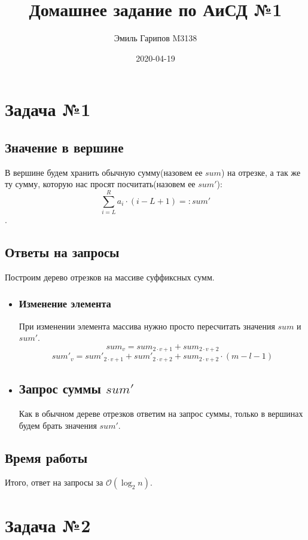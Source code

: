\documentclass{article}
\title{Домашнее задание по АиСД №1}
\date{2020-04-19}
\author{Эмиль Гарипов M3138}
\begin{document}
\newcommand{\RomanNumeralCaps}[1]
{\MakeUppercase{\romannumeral #1}}


\maketitle
\newpage
{}

\section*{Задача №1}
\subsection*{Значение в вершине}
В вершине будем хранить обычную сумму(назовем ее $sum$) на отрезке, а так же ту сумму, которую нас просят посчитать(назовем ее $sum'$):
$$ \sum_{i = L}^{R}a_i\cdot(i - L + 1) =: sum'$$.

\subsection*{Ответы на запросы}
Построим дерево отрезков на массиве суффиксных сумм.
\begin{itemize}
	\item[\RomanNumeralCaps{1}]
	\subsubsection*{Изменение элемента} 
	При изменении элемента массива нужно просто пересчитать значения $sum$ и $sum'$.
	$$sum_v = sum_{2\cdot v + 1} + sum_{2\cdot v + 2}$$
	$$sum'_v = sum'_{2\cdot v + 1} + sum'_{2\cdot v + 2} + sum_{2\cdot v + 2}\cdot(m - l - 1)$$
	\item[\RomanNumeralCaps{2}]
	\subsection*{Запрос суммы $sum'$}
	Как в обычном дереве отрезков ответим на запрос суммы, только в вершинах будем брать значения $sum'$.

\end{itemize}
\subsection*{Время работы}
Итого, ответ на запросы за $\mathcal{O}(\log_2{n})$.


\section*{Задача №2}
\end{document}
